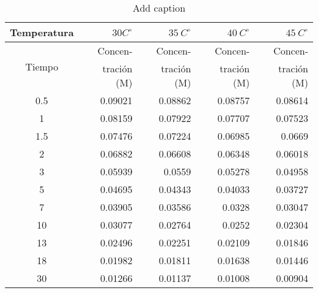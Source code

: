 \begin{table}[H]
    \centering
    \caption{Add caption}
      \begin{tabular}{crrrr}
      \hline
      \multicolumn{1}{l}{Temperatura} & $30 C^{\circ} $   & $35 \: C^{\circ}$    & $40 \: C^{\circ}$    & $45 \: C^{\circ}$ \\ \hline
      \multicolumn{1}{c}{\multirow{2}[0]{*}{Tiempo}} & \multicolumn{1}{p{5.39em}}{Concen-} & \multicolumn{1}{p{5.39em}}{Concen-} & \multicolumn{1}{p{5.39em}}{Concen-} & \multicolumn{1}{p{5.39em}}{Concen-} \\ 
            & \multicolumn{1}{p{5.39em}}{tración (M)} & \multicolumn{1}{p{5.39em}}{tración (M)} & \multicolumn{1}{p{5.39em}}{tración (M)} & \multicolumn{1}{p{5.39em}}{tración (M)} \\ \hline
      0.5   & 0.09021 & 0.08862 & 0.08757 & 0.08614 \\
      1     & 0.08159 & 0.07922 & 0.07707 & 0.07523 \\
      1.5   & 0.07476 & 0.07224 & 0.06985 & 0.0669  \\
      2     & 0.06882 & 0.06608 & 0.06348 & 0.06018 \\
      3     & 0.05939 & 0.0559  & 0.05278 & 0.04958 \\
      5     & 0.04695 & 0.04343 & 0.04033 & 0.03727 \\
      7     & 0.03905 & 0.03586 & 0.0328  & 0.03047 \\
      10    & 0.03077 & 0.02764 & 0.0252  & 0.02304 \\
      13    & 0.02496 & 0.02251 & 0.02109 & 0.01846 \\
      18    & 0.01982 & 0.01811 & 0.01638 & 0.01446 \\
      30    & 0.01266 & 0.01137 & 0.01008 & 0.00904 \\ \hline
      \end{tabular}%
    \label{tab:addlabel}%
  \end{table}%
  